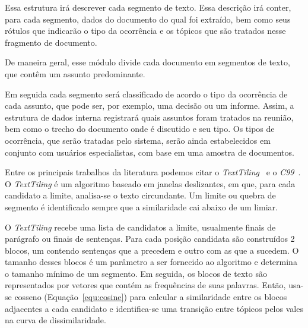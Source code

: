 Essa estrutura irá descrever cada segmento de texto. Essa descrição irá conter, para cada segmento, dados do documento do qual foi extraído, bem como seus rótulos que indicarão o tipo da ocorrência e os tópicos que são tratados nesse fragmento de documento.

De maneira geral, esse módulo divide cada documento em segmentos de texto, que contêm um assunto predominante. 


Em seguida cada segmento será classificado de acordo o tipo da ocorrência de cada assunto, que pode ser, por exemplo, uma decisão ou um informe. Assim, a estrutura de dados interna registrará quais assuntos foram tratados na reunião, bem como o trecho do documento onde é discutido e seu tipo. Os tipos de ocorrência, que serão tratadas pelo sistema, serão ainda estabelecidos em conjunto com usuários especialistas, com base em uma amostra de documentos.





















Entre os principais trabalhos da literatura podemos citar o  \textit{TextTiling}~\cite{Hearst1994} e o \textit{C99}~\cite{Choi2000}.
%
O \textit{TextTiling} é um algoritmo baseado em janelas deslizantes, em  que, para cada candidato a limite, analisa-se o texto circundante. Um limite ou quebra de segmento é identificado sempre que a similaridade cai abaixo de um limiar.


O \textit{TextTiling} recebe uma lista de candidatos a limite, usualmente finais de parágrafo ou finais de sentenças. Para cada posição candidata são construídos 2 blocos, um contendo sentenças que a precedem e outro com as que a sucedem. O tamanho desses blocos é um parâmetro a ser fornecido ao algoritmo e determina o tamanho mínimo de um segmento.
%
Em seguida, os blocos de texto são representados por vetores que contém as frequências de suas palavras. Então, usa-se cosseno (Equação~\ref{equ:cosine}) para calcular a similaridade entre os blocos adjacentes a cada candidato e identifica-se uma transição entre tópicos pelos vales na curva de dissimilaridade.

